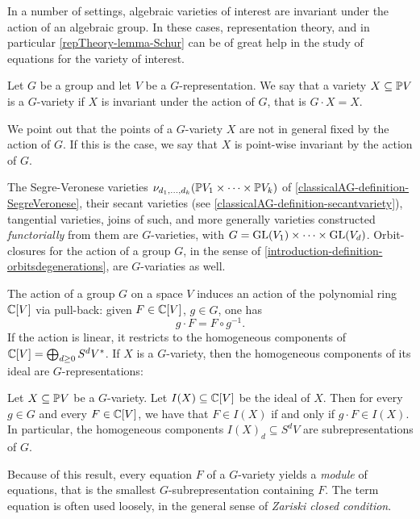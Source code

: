 In a number of settings, algebraic varieties of interest are invariant under the action of an algebraic group. In these cases, representation theory, and in particular \ref{repTheory-lemma-Schur} can be of great help in the study of equations for the variety of interest.

\begin{definition}
 \label{repTheory-definition-Gvariety}
 Let $G$ be a group and let $V$ be a $G$-representation. We say that a variety $X \subseteq \mathbb{P} V$ is a $G$-variety if $X$ is invariant under the action of $G$, that is $G \cdot X = X$. 
\end{definition}
We point out that the points of a $G$-variety $X$ are not in general fixed by the action of $G$. If this is the case, we say that $X$ is point-wise invariant by the action of $G$.

The Segre-Veronese varieties $\nu_{d_1 , \ldots , d_k} ( \mathbb{P} V_1 \times \cdots \times \mathbb{P} V_k)$ of \ref{classicalAG-definition-SegreVeronese}, their secant varieties (see \ref{classicalAG-definition-secantvariety}), tangential varieties, joins of such, and more generally varieties constructed \emph{functorially} from them are $G$-varieties, with $G = \mathrm{GL}(V_1) \times \cdots \times \mathrm{GL}(V_d)$. Orbit-closures for the action of a group $G$, in the sense of \ref{introduction-definition-orbitsdegenerations}, are $G$-variaties as well.

The action of a group $G$ on a space $V$ induces an action of the polynomial ring $\mathbb{C}[V]$ via pull-back: given $F \in \mathbb{C}[V]$, $g \in G$, one has 
\[
g \cdot F = F \circ g^{-1}.
\]
If the action is linear, it restricts to the homogeneous components of $\mathbb{C}[V] = \bigoplus_{d \geq 0} S^d V^*$. If $X$ is a $G$-variety, then the homogeneous components of its ideal are $G$-representations:
\begin{lemma}
\label{repTheory-lemma-GactionOnIdeal}
 Let $X \subseteq \mathbb{P} V$ be a $G$-variety. Let $I(X) \subseteq \mathbb{C}[V]$ be the ideal of $X$. Then for every $g \in G$ and every $F \in \mathbb{C}[V]$, we have that $F \in I(X)$ if and only if $g \cdot F \in I(X)$. In particular, the homogeneous components $I(X)_d \subseteq  S^d V$ are subrepresentations of $G$.
\end{lemma}
Because of this result, every equation $F$ of a $G$-variety yields a \emph{module} of equations, that is the smallest $G$-subrepresentation containing $F$. The term equation is often used loosely, in the general sense of \emph{Zariski closed condition}.

